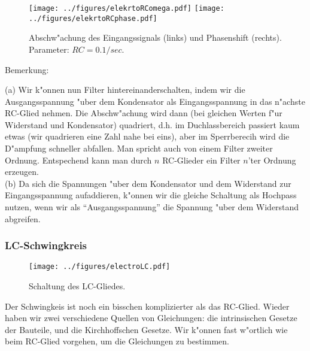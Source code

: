
\begin{figure}[t] %
   \centering
   \texttt{[image: ../figures/elekrtoRComega.pdf]} 
      \texttt{[image: ../figures/elekrtoRCphase.pdf]} 
   \caption{Abschw"achung des Eingangssignals (links) und Phasenshift (rechts).  Parameter: $RC=0.1/sec$. 
   }
   \label{ele4}
\end{figure}

Bemerkung:\par
(a) Wir k"onnen nun Filter hintereinanderschalten, indem wir die Ausgangsspannung "uber dem
Kondensator als Eingangsspannung in das n"achste RC-Glied nehmen. Die Abschw"achung wird dann 
(bei gleichen Werten f"ur Widerstand und Kondensator) quadriert, d.h. im Duchlassbereich passiert
kaum etwas (wir quadrieren eine Zahl nahe bei eins), aber im Sperrberecih wird die D"ampfung schneller abfallen.
Man spricht auch von einem Filter zweiter Ordnung. Entspechend kann man durch $n$ RC-Glieder ein Filter
$n$'ter Ordnung erzeugen. \\
(b) Da sich die Spannungen "uber dem Kondensator und dem Widerstand zur Eingangsspannung aufaddieren,
k"onnen wir die gleiche Schaltung als Hochpass nutzen, wenn wir als ``Ausgangsspannung'' die Spannung "uber
dem Widerstand abgreifen. 

\par\bigskip\bigskip\bigskip


\subsubsection{LC-Schwingkreis}

\begin{figure}[t] %
   \centering
   \texttt{[image: ../figures/electroLC.pdf]} 
   \caption{Schaltung des LC-Gliedes.
   }
   \label{eleLCX}
\end{figure}


Der Schwingkeis ist noch ein bisschen komplizierter als das RC-Glied. Wieder haben wir zwei verschiedene
Quellen von Gleichungen: die intrinsischen Gesetze der Bauteile, und die Kirchhoffschen Gesetze. Wir k"onnen fast w"ortlich wie beim RC-Glied vorgehen, um die Gleichungen zu bestimmen. 


